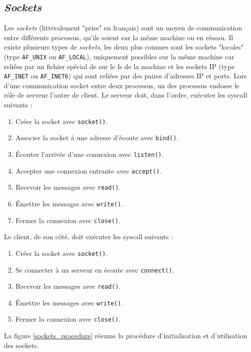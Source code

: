 \documentclass[a4paper, 12pt]{article}
\begin{document}
\subsection{\textit{Sockets}}\label{sockets_doc}
Les \textit{sockets} (littéralement "prise" en français) sont un moyen de communication entre 
différents processus, qu'ils soient sur la même machine ou en réseau. Il existe plusieurs types 
de \textit{sockets}, les deux plus connues sont les sockets "locales" (type \texttt{AF_UNIX} ou 
\texttt{AF_LOCAL}), uniquement possibles sur la même machine car reliées par un fichier spécial 
de sur le \acrshort{fs} de la machine et les sockets IP (type \texttt{AF_INET} ou 
\texttt{AF_INET6}) qui sont reliées par des paires d'adresses IP et ports.
Lors d'une communication socket entre deux processus, un des processus endosse le rôle de serveur 
l'autre de client. Le serveur doit, dans l'ordre, exécuter les \acrshort{syscall} suivants : 
\begin{enumerate}
    \item Créer la socket avec \texttt{socket()}.
    \item Associer la socket à une adresse d'écoute avec \texttt{bind()}.
    \item Écouter l'arrivée d'une connexion avec \texttt{listen()}.
    \item Accepter une connexion entrante avec \texttt{accept()}.
    \item Recevoir les messages avec \texttt{read()}.
    \item Émettre les messages avec \texttt{write()}.
    \item Fermer la connexion avec \texttt{close()}.
\end{enumerate}
Le client, de son côté, doit exécuter les \acrshort{syscall} suivants :
\begin{enumerate}
    \item Créer la socket avec \texttt{socket()}.
    \item Se connecter à un serveur en écoute avec \texttt{connect()}.
    \item Recevoir les messages avec \texttt{read()}.
    \item Émettre les messages avec \texttt{write()}.
    \item Fermer la connexion avec \texttt{close()}.
\end{enumerate}
La figure \ref{sockets_procedure} résume la procédure d'initialisation et d'utilisation des sockets.
\end{document}
